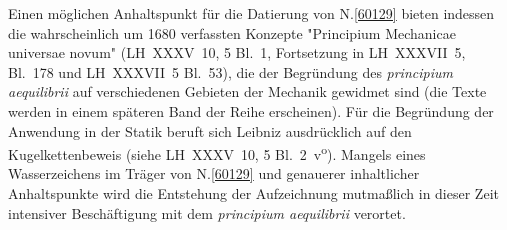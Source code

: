 \begin{ledgroup}
Einen möglichen Anhaltspunkt
für die Datierung von N.\;\ref{60129}
bieten indessen die wahrscheinlich um 1680 verfassten Konzepte 
"Principium Mechanicae universae novum"
(LH~XXXV~10, 5 Bl.~1, Fortsetzung in LH~XXXVII~5, Bl.~178 und LH~XXXVII~5 Bl.~53),
die der Begründung des \textit{principium aequilibrii} auf verschiedenen Gebieten der Mechanik gewidmet sind (die Texte werden in einem späteren Band der Reihe erscheinen). Für die Begründung der Anwendung in der Statik beruft sich Leibniz ausdrücklich auf den Kugelkettenbeweis (siehe LH~XXXV~10, 5 Bl.~2~v\textsuperscript{o}).
Mangels eines Wasserzeichens im Träger von N.\;\ref{60129} und genauerer inhaltlicher Anhaltspunkte 
wird die Entstehung der Aufzeichnung mutmaßlich in dieser Zeit intensiver Beschäftigung mit dem \textit{principium aequilibrii} verortet.
\pend
\end{ledgroup}


